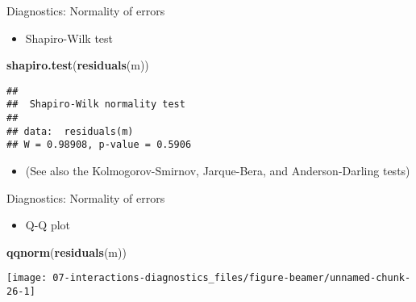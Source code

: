 \documentclass[
  ignorenonframetext,
]{beamer}
\newenvironment{Shaded}{\begin{snugshade}}{\end{snugshade}}
\newcommand{\FunctionTok}[1]{\textcolor[rgb]{0.13,0.29,0.53}{\textbf{#1}}}
\newcommand{\NormalTok}[1]{#1}
\providecommand{\tightlist}{%
  \setlength{\itemsep}{0pt}\setlength{\parskip}{0pt}}
\newcommand{\setsep}{\setlength{\itemsep}{3pt}}
\newcommand{\setskip}{\setlength{\parskip}{3pt}}
\renewcommand{\tightlist}{\setsep\setskip}
\begin{document}
\begin{frame}[fragile]{Diagnostics: Normality of errors}
\label{diagnostics-normality-of-errors}
\pause

\begin{itemize}[<+->]
\tightlist
\item
  Shapiro-Wilk test
\end{itemize}

\begin{Shaded}
\begin{Highlighting}[]
\FunctionTok{shapiro.test}\NormalTok{(}\FunctionTok{residuals}\NormalTok{(m))}
\end{Highlighting}
\end{Shaded}

\begin{verbatim}
## 
##  Shapiro-Wilk normality test
## 
## data:  residuals(m)
## W = 0.98908, p-value = 0.5906
\end{verbatim}

\begin{itemize}[<+->]
\tightlist
\item
  (See also the Kolmogorov-Smirnov, Jarque-Bera, and Anderson-Darling tests)
\end{itemize}
\end{frame}

\begin{frame}[fragile]{Diagnostics: Normality of errors}
\label{diagnostics-normality-of-errors-1}
\begin{itemize}[<+->]
\tightlist
\item
  Q-Q plot
\end{itemize}

\begin{Shaded}
\begin{Highlighting}[]
\FunctionTok{qqnorm}\NormalTok{(}\FunctionTok{residuals}\NormalTok{(m))}
\end{Highlighting}
\end{Shaded}

\texttt{[image: 07-interactions-diagnostics\_files/figure-beamer/unnamed-chunk-26-1]}
\end{frame}
\end{document}
